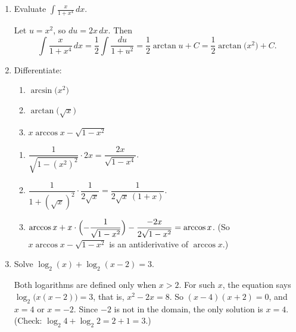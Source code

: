 \documentclass[12pt,letterpaper]{article}
\begin{document}
\begin{enumerate}[label=\textbf{\arabic*.},leftmargin=2em,itemsep=1.25em]
    \begin{solution}
      Let $x=2\tan\theta$ with $0\le\theta\le\frac\pi4$. Then
      $dx=2\sec^2\theta\,d\theta$ and $x^2+4=4\sec^2\theta$, so
      $\bigl(x^2+4\bigr)^{3/2}=8\sec^3\theta$; the bounds become $0$ and
      $\frac\pi4$. Hence
      \[
        \int_0^2\frac{dx}{\bigl(x^2+4\bigr)^{3/2}}
        =\int_0^{\pi/4}\frac{2\sec^2\theta}{8\sec^3\theta}\,d\theta
        =\frac14\int_0^{\pi/4}\cos\theta\,d\theta
        =\frac14\cdot\frac{\sqrt2}{2}=\frac{\sqrt2}{8}.
      \]
    \end{solution}

  \item Evaluate $\displaystyle\int\frac{x}{1+x^4}\,dx$.

    \begin{solution}
      Let $u=x^2$, so $du=2x\,dx$. Then
      \[
        \int\frac{x}{1+x^4}\,dx=\frac12\int\frac{du}{1+u^2}
        =\frac12\arctan u+C=\frac12\arctan\bigl(x^2\bigr)+C.
      \]
    \end{solution}

  \item Differentiate:
    \begin{enumerate}[label=(\alph*)]
      \item $\arcsin\bigl(x^2\bigr)$
      \item $\arctan\bigl(\sqrt x\bigr)$
      \item $x\arccos x-\sqrt{1-x^2}$
    \end{enumerate}

    \begin{solution}
      \begin{enumerate}[label=(\alph*)]
        \item $\dfrac{1}{\sqrt{1-(x^2)^2}}\cdot2x=\dfrac{2x}{\sqrt{1-x^4}}$.
        \item $\dfrac{1}{1+(\sqrt x)^2}\cdot\dfrac{1}{2\sqrt x}
          =\dfrac{1}{2\sqrt x\,(1+x)}$.
        \item $\arccos x+x\cdot\Bigl(-\dfrac{1}{\sqrt{1-x^2}}\Bigr)
          -\dfrac{-2x}{2\sqrt{1-x^2}}=\arccos x$.
          (So $x\arccos x-\sqrt{1-x^2}$ is an antiderivative of
          $\arccos x$.)
      \end{enumerate}
    \end{solution}

  \item Solve $\log_2(x)+\log_2(x-2)=3$.

    \begin{solution}
      Both logarithms are defined only when $x>2$. For such $x$, the equation
      says $\log_2\bigl(x(x-2)\bigr)=3$, that is, $x^2-2x=8$. So
      $(x-4)(x+2)=0$, and $x=4$ or $x=-2$. Since $-2$ is not in the domain,
      the only solution is $x=4$. (Check: $\log_2 4+\log_2 2=2+1=3$.)
    \end{solution}


\end{enumerate}
\end{document}
